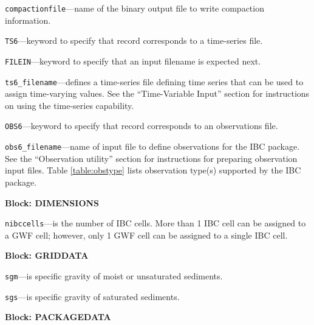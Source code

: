 \begin{description}
\item \texttt{compactionfile}---name of the binary output file to write compaction information.

\item \texttt{TS6}---keyword to specify that record corresponds to a time-series file.

\item \texttt{FILEIN}---keyword to specify that an input filename is expected next.

\item \texttt{ts6\_filename}---defines a time-series file defining time series that can be used to assign time-varying values. See the ``Time-Variable Input'' section for instructions on using the time-series capability.

\item \texttt{OBS6}---keyword to specify that record corresponds to an observations file.

\item \texttt{obs6\_filename}---name of input file to define observations for the IBC package. See the ``Observation utility'' section for instructions for preparing observation input files. Table \ref{table:obstype} lists observation type(s) supported by the IBC package.

\end{description}
\item \textbf{Block: DIMENSIONS}

\begin{description}
\item \texttt{nibccells}---is the number of IBC cells.  More than 1 IBC cell can be assigned to a GWF cell; however, only 1 GWF cell can be assigned to a single IBC cell.

\end{description}
\item \textbf{Block: GRIDDATA}

\begin{description}
\item \texttt{sgm}---is specific gravity of moist or unsaturated sediments.

\item \texttt{sgs}---is specific gravity of saturated sediments.

\end{description}
\item \textbf{Block: PACKAGEDATA}


